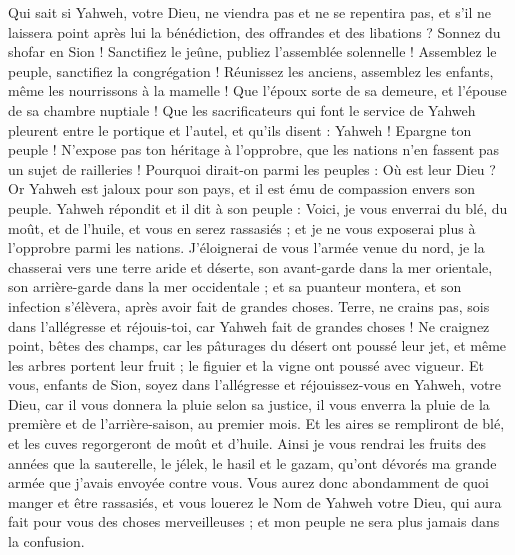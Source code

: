 \begin{multicols}{2}
Qui sait si Yahweh, votre Dieu, ne viendra pas et ne se repentira pas, et s'il ne laissera point après lui la bénédiction, des offrandes et des libations ?
Sonnez du shofar en Sion ! Sanctifiez le jeûne, publiez l'assemblée solennelle !
Assemblez le peuple, sanctifiez la congrégation ! Réunissez les anciens, assemblez les enfants, même les nourrissons à la mamelle ! Que l’époux sorte de sa demeure, et l’épouse de sa chambre nuptiale !
Que les sacrificateurs qui font le service de Yahweh pleurent entre le portique et l'autel, et qu'ils disent : Yahweh ! Epargne ton peuple ! N’expose pas ton héritage à l'opprobre, que les nations n’en fassent pas un sujet de railleries ! Pourquoi dirait-on parmi les peuples : Où est leur Dieu ?
Or Yahweh est jaloux pour son pays, et il est ému de compassion envers son peuple.
Yahweh répondit et il dit à son peuple : Voici, je vous enverrai du blé, du moût, et de l'huile, et vous en serez rassasiés ; et je ne vous exposerai plus à l'opprobre parmi les nations.
J'éloignerai de vous l’armée venue du nord, je la chasserai vers une terre aride et déserte, son avant-garde dans la mer orientale, son arrière-garde dans la mer occidentale ; et sa puanteur montera, et son infection s’élèvera, après avoir fait de grandes choses.
Terre, ne crains pas, sois dans l’allégresse et réjouis-toi, car Yahweh fait de grandes choses !
Ne craignez point, bêtes des champs, car les pâturages du désert ont poussé leur jet, et même les arbres portent leur fruit ; le figuier et la vigne ont poussé avec vigueur.
Et vous, enfants de Sion, soyez dans l’allégresse et réjouissez-vous en Yahweh, votre Dieu, car il vous donnera la pluie selon sa justice, il vous enverra la pluie de la première et de l’arrière-saison, au premier mois.
Et les aires se rempliront de blé, et les cuves regorgeront de moût et d'huile.
Ainsi je vous rendrai les fruits des années que la sauterelle, le jélek, le hasil et le gazam, qu'ont dévorés ma grande armée que j’avais envoyée contre vous.
Vous aurez donc abondamment de quoi manger et être rassasiés, et vous louerez le Nom de Yahweh votre Dieu, qui aura fait pour vous des choses merveilleuses ; et mon peuple ne sera plus jamais dans la confusion.

\end{multicols}
